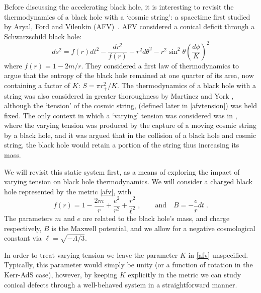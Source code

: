 \documentclass[
twoside,openright,frontopenright]{dmathesis}
\begin{document}
Before discussing the accelerating black hole, it is interesting to revisit the
thermodynamics of a black hole with a `cosmic string': a spacetime first studied
by Aryal, Ford and Vilenkin (AFV)~\cite{Aryal:1986sz}. AFV considered a conical
deficit through a Schwarzschild black hole:
\begin{equation}
ds^2 = f(r) dt^2 - \frac{dr^2}{f(r)} - r^2 d\theta^2
- r^2 \sin^2\theta \left (\frac{d\phi}{K}\right ) ^2
\label{afv}
\end{equation}
where $f(r) = 1 -2m/r$. They considered a first law of thermodynamics to argue
that the entropy of the black hole remained at one quarter of its area, now
containing a factor of $K$: $S = \pi r_+^2/K$. The thermodynamics of a black
hole with a string was also considered in greater thoroughness by Martinez and
York \cite{Martinez:1990sd}, although the `tension' of the cosmic string,
(defined later in \eqref{afvtension}) was held fixed. The only context in which
a `varying' tension was considered was in \cite{Bonjour:1998rf}, where the
varying tension was produced by the capture of a moving cosmic string by a black
hole, and it was argued that in the collision of a black hole and cosmic string,
the black hole would retain a portion of the string thus increasing its mass.

We will revisit this static system first, as a means of exploring the impact of
varying tension on black hole thermodynamics. We will consider
a charged black hole represented by the metric \eqref{afv}, with
\begin{equation}
f(r) = 1-\frac{2m}{r} + \frac{e^{2}}{r^{2}} + \frac{r^{2}}{\ell^2}\;, \qquad
\text{and} \quad {B} = - \frac{e}{r} dt\;.
\end{equation}
The parameters $m$ and $e$ are related to the black hole's mass, 
and charge respectively, $B$ is the Maxwell potential, and we allow 
for a negative cosmological constant via $\ell = \sqrt{-\Lambda/3}$.

In order to treat varying tension we leave the parameter $K$ in \eqref{afv}
unspecified.  Typically, this parameter would simply be unity (or a function of
rotation in the Kerr-AdS case), however, by keeping $K$ explicitly in the metric
we can study conical defects through a well-behaved system in a straightforward
manner.
\end{document}
